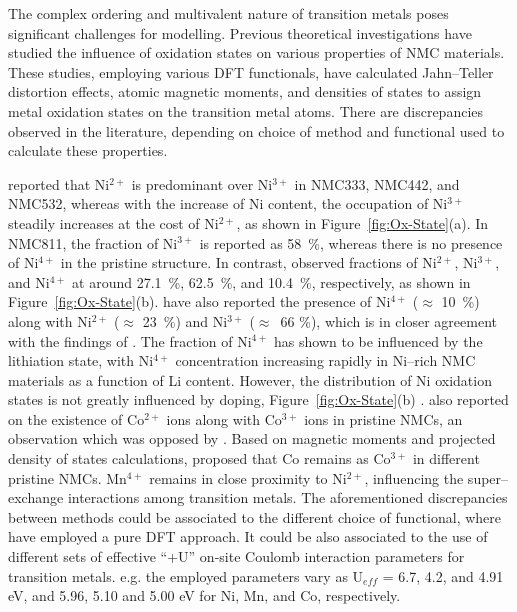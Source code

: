 \documentclass[journal=jacsat,manuscript=article]{achemso}
\begin{document}
The complex ordering and multivalent nature of transition metals poses significant challenges for modelling.
Previous theoretical investigations have studied the influence of oxidation states on various properties of NMC materials.\cite{Dan-Thomas-chemmater,sun_electronic_2017,Dixit_JPhysChemC2017,Hoang_ACSChemMater2016,Dixit_JElecSoc2017,susai2019improving}
These studies, employing various DFT functionals, have calculated Jahn--Teller distortion effects, atomic magnetic moments, and densities of states to assign metal oxidation states on the transition metal atoms.
There are discrepancies observed in the literature, depending on choice of method and functional used to calculate these properties.

\citeauthor{sun_electronic_2017}\cite{sun_electronic_2017} reported that Ni$^{2+}$ is predominant over Ni$^{3+}$ in NMC333, NMC442, and NMC532, whereas with the increase of Ni content, the occupation of Ni$^{3+}$ steadily increases at the cost of Ni$^{2+}$, as shown in Figure~\ref{fig:Ox-State}(a). 
In NMC811, the fraction of Ni$^{3+}$ is reported as 58~\%, whereas there is no presence of Ni$^{4+}$ in the pristine structure.\cite{sun_electronic_2017}
In contrast, \citeauthor{susai2019improving}\cite{susai2019improving} observed fractions of Ni$^{2+}$, Ni$^{3+}$, and Ni$^{4+}$ at around 27.1~\%, 62.5~\%, and 10.4~\%, respectively, as shown in Figure~\ref{fig:Ox-State}(b). \citeauthor{Dixit_JPhysChemC2017}\cite{Dixit_JPhysChemC2017} have also reported the presence of  Ni$^{4+}$ ($\approx$ 10~\%) along with Ni$^{2+}$ ($\approx$ 23~\%) and Ni$^{3+}$ ($\approx$~66 \%), which is in closer agreement with the findings of \citeauthor{susai2019improving}.
The fraction of Ni$^{4+}$ has shown to be influenced by the lithiation state, with Ni$^{4+}$ concentration increasing rapidly in Ni--rich NMC materials as a function of Li content.
However, the distribution of Ni oxidation states is not greatly influenced by doping, Figure~\ref{fig:Ox-State}(b) .\cite{Dixit_JPhysChemC2017,susai2019improving}
\citeauthor{sun_electronic_2017}\cite{sun_electronic_2017} also reported on the existence of Co$^{2+}$ ions along with Co$^{3+}$ ions in pristine NMCs, an observation which was opposed by \citeauthor{Dixit_JPhysChemC2017}.\cite{Dixit_JPhysChemC2017}
Based on magnetic moments and projected density of states calculations, \citeauthor{Dixit_JPhysChemC2017} proposed that Co remains as Co$^{3+}$ in different pristine NMCs.\cite{Dixit_JPhysChemC2017}
Mn$^{4+}$ remains in close proximity to Ni$^{2+}$, influencing the super--exchange interactions among transition metals.\cite{zheng2019}
The aforementioned discrepancies between methods could be associated to the different choice of functional, where \citeauthor{Dixit_JPhysChemC2017}\cite{Dixit_JPhysChemC2017} have employed a pure DFT approach.
It could be also associated to the use of different sets of effective ``+U'' on-site Coulomb interaction parameters for transition metals. e.g. the employed parameters vary as U$_{eff}$ = 6.7, 4.2, and 4.91 eV\cite{sun_electronic_2017}, and  5.96, 5.10 and 5.00 eV\cite{susai2019improving} for Ni, Mn, and Co, respectively.  
\end{document}
